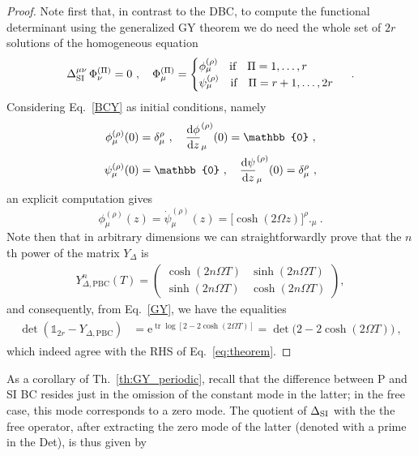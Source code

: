 \documentclass[12pt,a4paper]{article}
\numberwithin{equation}{section}
\numberwithin{equation}{section}
\newcommand{\tr}{\operatorname{tr}}
\begin{document}
\begin{proof}
Note first that, in contrast to the DBC, to compute the functional determinant using the generalized GY theorem we do need the whole set of $2r$ solutions of the homogeneous equation
\begin{equation}
\Delta_{\rm SI}^{\mu\nu} \, \Phi_\nu^{(\Pi)}=0\ , \quad \Phi^{(\Pi)}_\mu=\begin{cases}
 \phi_\mu^{(\rho)} \quad \text{if} \quad \Pi=1,\dots,r \\
 \psi_\mu^{(\rho)} \quad \text{if} \quad \Pi=r+1,\dots,2r
\end{cases}\ .
\end{equation}
 Considering Eq.~\eqref{BCY} as initial conditions, namely 
\begin{align}
\phi_\mu^{(\rho)}(0)&=\delta^\rho_\mu\ , \quad \frac{{\rm d}\phi}{{\rm d}z}_\mu^{(\rho)}(0)=\mathbb{0}\ ,
\\
\psi_\mu^{(\rho)}(0)&=\mathbb{0}\ , \quad \frac{{\rm d}\psi}{{\rm d}z}_\mu^{(\rho)}(0)=\delta^\rho_\mu\ ,
\end{align}
an explicit computation gives
\begin{equation}
\phi_\mu^{(\rho)}(z)=\dot{\psi}_\mu^{(\rho)}(z)=\Big[\cosh(2\Omega z)\Big]^\rho{}\Big._\mu\ .
\end{equation}
Note then that in arbitrary dimensions we can straightforwardly prove that the $n$th power of the matrix $Y_\Delta$ is
\begin{align}
 Y^n_{\Delta, \mathrm{PBC}} (T)= \begin{pmatrix}
 \cosh(2n\Omega T) & \sinh(2n\Omega T)
 \\
 \sinh(2n\Omega T) & \cosh(2n\Omega T)
 \end{pmatrix},
\end{align}
and consequently, from Eq.~\eqref{GY}, we have the equalities
\begin{align}
 \begin{split}
 \det(\mathbb{1}_{2r} - Y_{\Delta, \mathrm{PBC}}) 
 &= \mathrm{e}^{\tr \log [2-2 \cosh(2\Omega T)]}
 = \det \big(2-2\cosh(2\Omega T)\big) \ ,
 \end{split}
\end{align}
which indeed agree with the RHS of Eq.~\eqref{eq:theorem}. 
\end{proof}
As a corollary of Th.~\ref{th:GY_periodic}, recall that the difference between P and SI BC resides just in the omission of the constant mode in the latter; in the free case, this mode corresponds to a zero mode. The quotient of $\Delta_{\rm SI}$ with the the free operator, after extracting the zero mode of the latter (denoted with a prime in the Det), is thus given by
\end{document}

